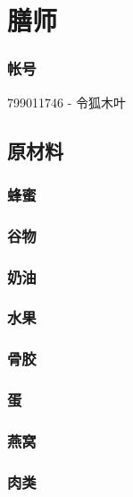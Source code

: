 \documentclass[12pt,a4paper,landscape]{article}
\begin{document}
\begin{CJK}{UTF8}{gbsn}
\subsubsection{}
\subsubsection{}
\subsubsection{}
\subsubsection{}


\section{膳师}
\subsubsection{帐号}
799011746 - 令狐木叶
\subsection{原材料}
\subsubsection{蜂蜜}
\subsubsection{谷物}
\subsubsection{奶油}
\subsubsection{水果}
\subsubsection{骨胶}
\subsubsection{蛋}
\subsubsection{燕窝}
\subsubsection{肉类}

\end{CJK}
\end{document}
